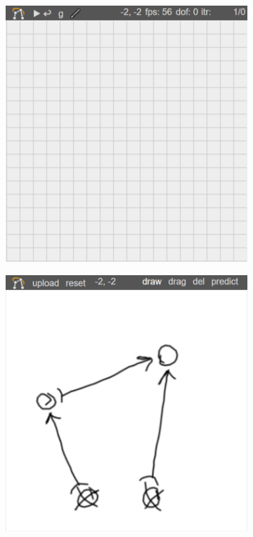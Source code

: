 \begin{figure}
    \centering
    \begin{subfigure}[b]{0.32\textwidth}
        \includegraphics[width=\textwidth]{images/prototype_before.png}
        \caption{}\label{fig:prototype_before}
    \end{subfigure}
    \begin{subfigure}[b]{0.32\textwidth}
        \includegraphics[width=\textwidth]{images/prototype_drawing_inverted.png}

\end{subfigure}
\end{figure}
